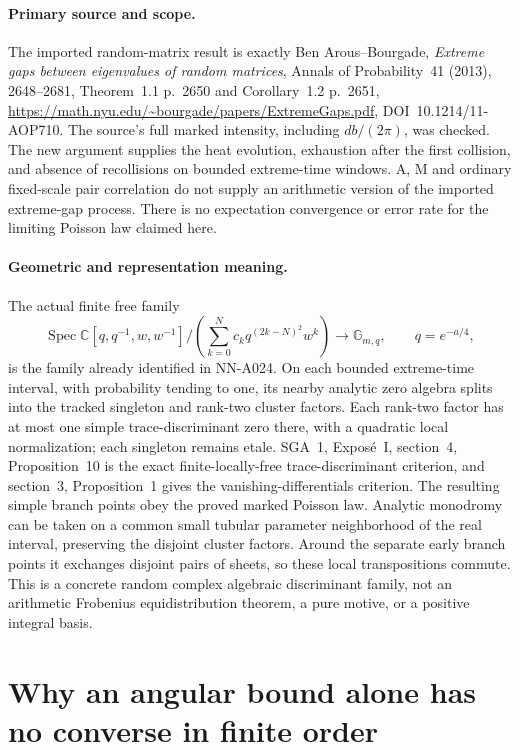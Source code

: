 \paragraph{Primary source and scope.}
The imported random-matrix result is exactly Ben Arous--Bourgade,
\emph{Extreme gaps between eigenvalues of random matrices},
Annals of Probability~41 (2013), 2648--2681,
Theorem~1.1 p.~2650 and Corollary~1.2 p.~2651,
\url{https://math.nyu.edu/~bourgade/papers/ExtremeGaps.pdf},
DOI~10.1214/11-AOP710. The source's full marked intensity,
including $db/(2\pi)$, was checked. The new argument supplies
the heat evolution, exhaustion after the first collision,
and absence of recollisions on bounded extreme-time windows.
A, M and ordinary fixed-scale pair correlation do not supply
an arithmetic version of the imported extreme-gap process.
There is no expectation convergence or error rate for the
limiting Poisson law claimed here.

\paragraph{Geometric and representation meaning.}
The actual finite free family
\[
 \operatorname{Spec}\mathbb C[q,q^{-1},w,w^{-1}]/
       \left(\sum_{k=0}^Nc_kq^{(2k-N)^2}w^k\right)
                           \longrightarrow\mathbb G_{m,q},
                  \qquad q=e^{-a/4},
\]
is the family already identified in NN-A024. On each bounded
extreme-time interval, with probability tending to one, its
nearby analytic zero algebra splits into the tracked singleton
and rank-two cluster factors. Each rank-two factor has at
most one simple trace-discriminant zero there, with a quadratic
local normalization; each singleton remains etale. SGA~1,
Expos\'e~I, section~4, Proposition~10 is the exact finite-locally-free
trace-discriminant criterion, and section~3, Proposition~1 gives
the vanishing-differentials criterion. The resulting simple
branch points obey the proved marked Poisson law. Analytic
monodromy can be taken on a common small tubular parameter
neighborhood of the real interval, preserving the disjoint
cluster factors. Around the separate early branch points it
exchanges disjoint pairs of sheets, so these local transpositions
commute.
This is a concrete random complex algebraic discriminant family,
not an arithmetic Frobenius equidistribution theorem, a pure
motive, or a positive integral basis.


\section{Why an angular bound alone has no converse in finite order}
\label{sec:analytic-angle-only-obstruction}

